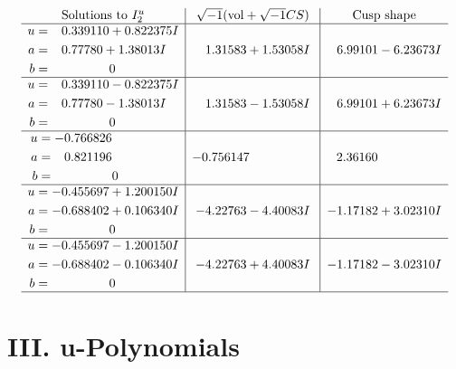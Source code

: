 \documentclass[1p]{elsarticle_modified}
\theoremstyle{definition}
\newcommand{\I}{\sqrt{-1}}
\begin{document}
$$\begin{array}{c|c|c}  
\text{Solutions to }I^u_{2}& \I (\text{vol} + \sqrt{-1}CS) & \text{Cusp shape}\\
 \hline 
\begin{aligned}
u &= \phantom{-}0.339110 + 0.822375 I \\
a &= \phantom{-}0.77780 + 1.38013 I \\
b &= \phantom{-0.000000 } 0\end{aligned}
 & \phantom{-}1.31583 + 1.53058 I & \phantom{-}6.99101 - 6.23673 I \\ \hline\begin{aligned}
u &= \phantom{-}0.339110 - 0.822375 I \\
a &= \phantom{-}0.77780 - 1.38013 I \\
b &= \phantom{-0.000000 } 0\end{aligned}
 & \phantom{-}1.31583 - 1.53058 I & \phantom{-}6.99101 + 6.23673 I \\ \hline\begin{aligned}
u &= -0.766826\phantom{ +0.000000I} \\
a &= \phantom{-}0.821196\phantom{ +0.000000I} \\
b &= \phantom{-0.000000 } 0\end{aligned}
 & -0.756147\phantom{ +0.000000I} & \phantom{-}2.36160\phantom{ +0.000000I} \\ \hline\begin{aligned}
u &= -0.455697 + 1.200150 I \\
a &= -0.688402 + 0.106340 I \\
b &= \phantom{-0.000000 } 0\end{aligned}
 & -4.22763 - 4.40083 I & -1.17182 + 3.02310 I \\ \hline\begin{aligned}
u &= -0.455697 - 1.200150 I \\
a &= -0.688402 - 0.106340 I \\
b &= \phantom{-0.000000 } 0\end{aligned}
 & -4.22763 + 4.40083 I & -1.17182 - 3.02310 I\\
 \hline 
 \end{array}$$\newpage
\newpage\renewcommand{\arraystretch}{1}
\centering \section*{ III. u-Polynomials}
\end{document}
